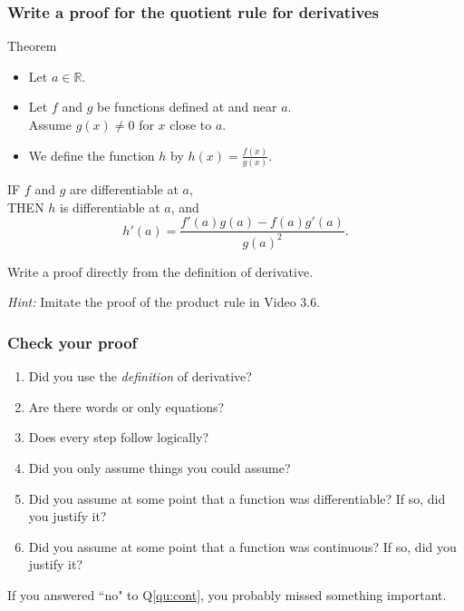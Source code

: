 \documentclass[14pt]{beamer}
\begin{document}

	\begin{frame}[t]
		\fontsize{13}{13}\selectfont
		\frametitle{Write a proof for the quotient rule for derivatives}

		\begin{block}{Theorem}
			\begin{itemize}
				\item Let $a \in \mathbb{R}$.

				\item Let $f$ and $g$ be functions defined at and near $a$. \\ Assume
					$g(x) \neq 0$ for $x$ close to $a$.

				\item We define the function $h$ by $\displaystyle h(x) = \frac{f(x)}{g(x)}$.
			\end{itemize}

			IF $f$ and $g$ are differentiable at $a$, \\ THEN $h$ is differentiable at
			$a$, and
			\[
				h'(a) = \frac{f'(a) g(a) - f(a) g'(a)}{g(a)^{2}}.
			\]
		\end{block}

		\vfill

		Write a proof directly from the definition of derivative.

		\emph{Hint:} Imitate the proof of the product rule in Video 3.6.
	\end{frame}


	\begin{frame}[t]
		\frametitle{Check your proof}

		\begin{enumerate}
			\item Did you use the \emph{definition} of derivative?

			\item Are there words or only equations?

			\item Does every step follow logically?

			\item Did you only assume things you could assume?

			\item Did you assume at some point that a function was differentiable? If
				so, did you justify it?

			\item \label{qu:cont} Did you assume at some point that a function was continuous?
				If so, did you justify it?
		\end{enumerate}

		If you answered ``no" to Q\ref{qu:cont}, you probably missed something
		important.
	\end{frame}
\end{document}

